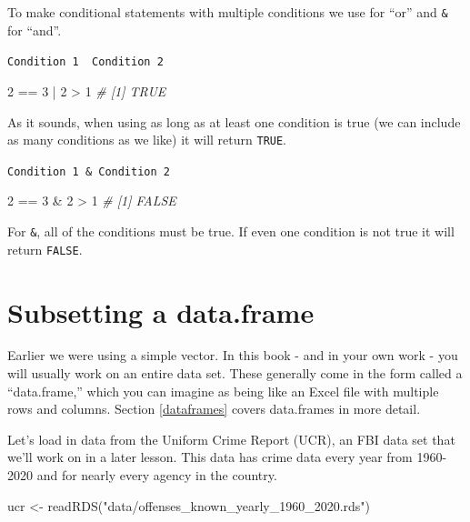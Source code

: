 \documentclass[
  a4paper,
]{krantz}
\makeatletter
\newenvironment{Shaded}{\begin{snugshade}}{\end{snugshade}}
\newcommand{\CommentTok}[1]{\textcolor[rgb]{0.37,0.37,0.37}{\textit{#1}}}
\newcommand{\DecValTok}[1]{\textcolor[rgb]{0.06,0.06,0.06}{#1}}
\newcommand{\FunctionTok}[1]{\textcolor[rgb]{0,0,0}{#1}}
\newcommand{\NormalTok}[1]{#1}
\newcommand{\OtherTok}[1]{\textcolor[rgb]{0.37,0.37,0.37}{#1}}
\newcommand{\SpecialCharTok}[1]{\textcolor[rgb]{0,0,0}{#1}}
\newcommand{\StringTok}[1]{\textcolor[rgb]{0.5,0.5,0.5}{#1}}
\newenvironment{kframe}{%
\medskip{}
\setlength{\fboxsep}{.8em}
 \def\at@end@of@kframe{}%
 \ifinner\ifhmode%
  \def\at@end@of@kframe{\end{minipage}}%
  \begin{minipage}{\columnwidth}%
 \fi\fi%
 \def\FrameCommand##1{\hskip\@totalleftmargin \hskip-\fboxsep
 \colorbox{shadecolor}{##1}\hskip-\fboxsep
     \hskip-\linewidth \hskip-\@totalleftmargin \hskip\columnwidth}%
 \MakeFramed {\advance\hsize-\width
   \@totalleftmargin\z@ \linewidth\hsize
   \@setminipage}}%
 {\par\unskip\endMakeFramed%
 \at@end@of@kframe}
\renewenvironment{Shaded}{\begin{kframe}}{\end{kframe}}
\makeatother
\begin{document}
To make conditional statements with multiple conditions we
use \texttt{\textbar{}} for ``or'' and \texttt{\&} for
``and''.

\texttt{Condition\ 1\ \textbar{}\ Condition\ 2}

\begin{Shaded}
\begin{Highlighting}[]
\DecValTok{2} \SpecialCharTok{==} \DecValTok{3} \SpecialCharTok{|} \DecValTok{2} \SpecialCharTok{\textgreater{}} \DecValTok{1}
\CommentTok{\# [1] TRUE}
\end{Highlighting}
\end{Shaded}

As it sounds, when using \texttt{\textbar{}} as long as at
least one condition is true (we can include as many
conditions as we like) it will return \texttt{TRUE}.

\texttt{Condition\ 1\ \&\ Condition\ 2}

\begin{Shaded}
\begin{Highlighting}[]
\DecValTok{2} \SpecialCharTok{==} \DecValTok{3} \SpecialCharTok{\&} \DecValTok{2} \SpecialCharTok{\textgreater{}} \DecValTok{1}
\CommentTok{\# [1] FALSE}
\end{Highlighting}
\end{Shaded}

For \texttt{\&}, all of the conditions must be true. If even
one condition is not true it will return \texttt{FALSE}.

\hypertarget{subsetting-a-data.frame}{%
\section{Subsetting a
data.frame}\label{subsetting-a-data.frame}}

Earlier we were using a simple vector. In this book - and in
your own work - you will usually work on an entire data set.
These generally come in the form called a ``data.frame,''
which you can imagine as being like an Excel file with
multiple rows and columns. Section \ref{dataframes} covers
data.frames in more detail.

Let's load in data from the Uniform Crime Report (UCR), an
FBI data set that we'll work on in a later lesson. This data
has crime data every year from 1960-2020 and for nearly
every agency in the country.

\begin{Shaded}
\begin{Highlighting}[]
\NormalTok{ucr }\OtherTok{\textless{}{-}} \FunctionTok{readRDS}\NormalTok{(}\StringTok{"data/offenses\_known\_yearly\_1960\_2020.rds"}\NormalTok{)}
\end{Highlighting}
\end{Shaded}
\end{document}
